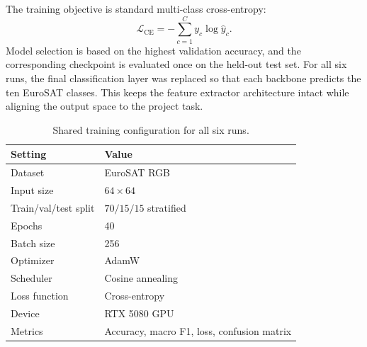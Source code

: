 \documentclass[11pt]{report}
\begin{document}
The training objective is standard multi-class cross-entropy:
\[
\mathcal{L}_{\mathrm{CE}} = -\sum_{c=1}^{C} y_c \log \hat{y}_c.
\]
Model selection is based on the highest validation accuracy, and the corresponding checkpoint is evaluated once on the held-out test set. For all six runs, the final classification layer was replaced so that each backbone predicts the ten EuroSAT classes. This keeps the feature extractor architecture intact while aligning the output space to the project task.

\begin{table}[h]
    \centering
    \caption{Shared training configuration for all six runs.}
    \begin{tabular}{ll}
        \toprule
        Setting & Value \\
        \midrule
        Dataset & EuroSAT RGB \\
        Input size & \(64 \times 64\) \\
        Train/val/test split & \(70/15/15\) stratified \\
        Epochs & 40 \\
        Batch size & 256 \\
        Optimizer & AdamW \\
        Scheduler & Cosine annealing \\
        Loss function & Cross-entropy \\
        Device & RTX 5080 GPU \\
        Metrics & Accuracy, macro F1, loss, confusion matrix \\
        \bottomrule
    \end{tabular}
\end{table}
\end{document}
